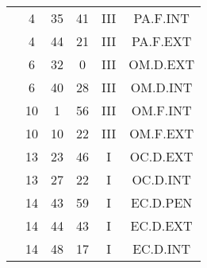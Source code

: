 \documentclass[12pt, a4paper]{article}
\begin{document}
\begin{multicols}{3}
{\begin{tabular}{c c c c c c}
	 	 	 	 & 4 & 35 & 41 & III & PA.F.INT\\%
	 	 	 	 & 4 & 44 & 21 & III & PA.F.EXT\\%
	 	 	 	 & 6 & 32 & 0 & III & OM.D.EXT\\%
	 	 	 	 & 6 & 40 & 28 & III & OM.D.INT\\%
	 	 	 	 & 10 & 1 & 56 & III & OM.F.INT\\%
	 	 	 	 & 10 & 10 & 22 & III & OM.F.EXT\\%
	 	 	 	 & 13 & 23 & 46 & I & OC.D.EXT\\%
	 	 	 	 & 13 & 27 & 22 & I & OC.D.INT\\%
	 	 	 	 & 14 & 43 & 59 & I & EC.D.PEN\\%
	 	 	 	 & 14 & 44 & 43 & I & EC.D.EXT\\%
	 	 	 	 & 14 & 48 & 17 & I & EC.D.INT\\%
	 	 \end{tabular}
 	}
\end{multicols}
\end{document}
